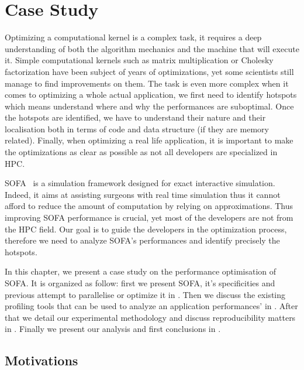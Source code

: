 \chapter{Case Study}
\label{chap:perf}

Optimizing a computational kernel is a complex task, it requires a deep understanding of both the algorithm mechanics and the machine that will execute it.
Simple computational kernels such as matrix multiplication or Cholesky factorization have been subject of years of optimizations, yet some scientists still manage to find improvements on them.
The task is even more complex when it comes to optimizing a whole actual application, we first need to identify hotspots which means understand where and why the performances are suboptimal.
Once the hotspots are identified, we have to understand their nature and their localisation both in terms of code and data structure (if they are memory related).
Finally, when optimizing a real life application, it is important to make the optimizations as clear as possible as not all developers are specialized in \gls{HPC}.

\gls{SOFA}~\cite{Allard07SOFA} is a simulation framework designed for exact interactive simulation.
Indeed, it aims at assisting surgeons with real time simulation thus  it cannot afford to reduce the amount of computation by relying on approximations.
Thus improving \gls{SOFA} performance is crucial, yet most of the developers are not from the \gls{HPC} field.
Our goal is to guide the developers in the optimization process, therefore we need to analyze \gls{SOFA}'s performances and identify precisely the hotspots.

In this chapter, we present a case study on the performance optimisation of \gls{SOFA}.
It is organized as follow: first we present \gls{SOFA}, it's specificities and previous attempt to parallelise or optimize it in .
Then we discuss the existing profiling tools that can be used to analyze an application performances' in .
After that we detail our experimental methodology and discuss reproducibility matters in .
Finally we present our analysis and first conclusions in .

\section{Motivations}
\label{sec:motivations}




